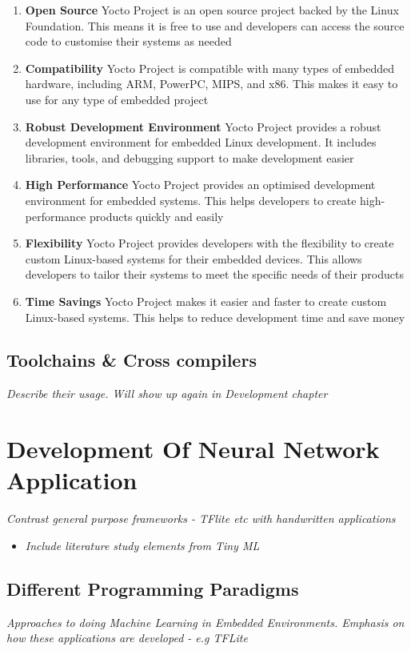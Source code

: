 \begin{enumerate}
	\item \textbf{Open Source} Yocto Project is an open source project backed by the Linux Foundation. This means it is free to use and developers can access the source code to customise their systems as needed
	\item \textbf{Compatibility} Yocto Project is compatible with many types of embedded hardware, including ARM, PowerPC, MIPS, and x86. This makes it easy to use for any type of embedded project
	\item \textbf{Robust Development Environment} Yocto Project provides a robust development environment for embedded Linux development. It includes libraries, tools, and debugging support to make development easier
	\item \textbf{High Performance} Yocto Project provides an optimised development environment for embedded systems. This helps developers to create high-performance products quickly and easily
	\item \textbf{Flexibility} Yocto Project provides developers with the flexibility to create custom Linux-based systems for their embedded devices. This allows developers to tailor their systems to meet the specific needs of their products
	\item \textbf{Time Savings} Yocto Project makes it easier and faster to create custom Linux-based systems. This helps to reduce development time and save money
\end{enumerate}

\subsection[SDKs \& Compiler Toolchains]{Toolchains \& Cross compilers}
\textit{Describe their usage. Will show up again in Development chapter}

\section[Development of Neural Network Application]{Development Of Neural Network Application}
\textit{Contrast general purpose frameworks - TFlite etc with handwritten applications}

\begin{itemize}
	\item \textit{Include literature study elements from Tiny ML}
\end{itemize}

\subsection{Different Programming Paradigms}
\textit{Approaches to doing Machine Learning in Embedded Environments. Emphasis on how these applications are developed - e.g TFLite}

